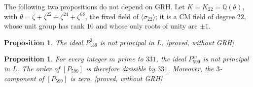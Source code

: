 \documentclass[11pt,a4paper]{amsart}
\theoremstyle{plain}
\newtheorem{proposition}[theorem]{Proposition}
\theoremstyle{definition}
\numberwithin{equation}{section}
\newcommand{\Q}{\mathbb{Q}}
\newcommand{\st}[1]{\textup{\textsf{\small[#1]}}}
\begin{document}
The following two propositions do not depend on GRH. Let $K=K_{22}=\Q(\theta)$, with $\theta=\zeta+\zeta^{22}+\zeta^{24}+\zeta^{68}$, the fixed field of $\langle\sigma_{22}\rangle$; it is a CM field of degree $22$, whose unit group has rank $10$ and whose only roots of unity are $\pm1$.

\begin{proposition}\label{prop:classeP139}
The ideal $P_{139}^3$ is not principal in $L$. \st{proved, without GRH}
\end{proposition}

\begin{proposition}\label{prop:classeP599}
For every integer $m$ prime to $331$, the ideal $P_{599}^m$ is not principal in $L$. The order of $[P_{599}]$ is therefore divisible by $331$. Moreover, the $3$-component of $[P_{599}]$ is zero. \st{proved, without GRH}
\end{proposition}
\end{document}
